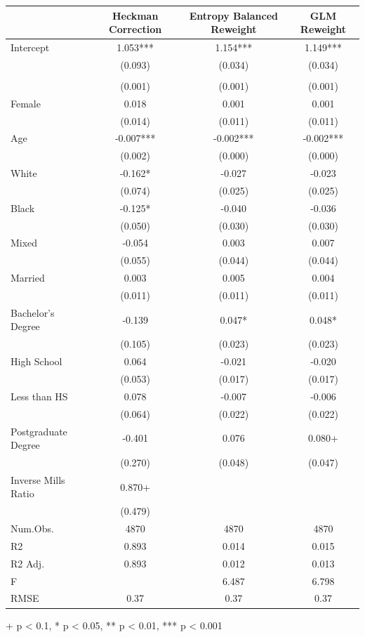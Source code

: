 \documentclass[
]{article}
\begin{document}
\begin{table}[t]
\fontsize{12.0pt}{14.4pt}\selectfont
\begin{tabular*}{\linewidth}{@{\extracolsep{\fill}}lccc}
\toprule
  & Heckman Correction & Entropy Balanced Reweight & GLM Reweight \\ 
\midrule\addlinespace[2.5pt]
Intercept & 1.053*** & 1.154*** & 1.149*** \\ 
 & (0.093) & (0.034) & (0.034) \\ 
{\cellcolor[HTML]{ADD8E6}{Unemployment Duration (Months)}} & {\cellcolor[HTML]{ADD8E6}{-0.006***}} & {\cellcolor[HTML]{ADD8E6}{-0.006***}} & {\cellcolor[HTML]{ADD8E6}{-0.006***}} \\ 
 & (0.001) & (0.001) & (0.001) \\ 
Female & 0.018 & 0.001 & 0.001 \\ 
 & (0.014) & (0.011) & (0.011) \\ 
Age & -0.007*** & -0.002*** & -0.002*** \\ 
 & (0.002) & (0.000) & (0.000) \\ 
White & -0.162* & -0.027 & -0.023 \\ 
 & (0.074) & (0.025) & (0.025) \\ 
Black & -0.125* & -0.040 & -0.036 \\ 
 & (0.050) & (0.030) & (0.030) \\ 
Mixed & -0.054 & 0.003 & 0.007 \\ 
 & (0.055) & (0.044) & (0.044) \\ 
Married & 0.003 & 0.005 & 0.004 \\ 
 & (0.011) & (0.011) & (0.011) \\ 
Bachelor's Degree & -0.139 & 0.047* & 0.048* \\ 
 & (0.105) & (0.023) & (0.023) \\ 
High School & 0.064 & -0.021 & -0.020 \\ 
 & (0.053) & (0.017) & (0.017) \\ 
Less than HS & 0.078 & -0.007 & -0.006 \\ 
 & (0.064) & (0.022) & (0.022) \\ 
Postgraduate Degree & -0.401 & 0.076 & 0.080+ \\ 
 & (0.270) & (0.048) & (0.047) \\ 
Inverse Mills Ratio & 0.870+ &  &  \\ 
{} & {(0.479)} & {} & {} \\ 
Num.Obs. & 4870 & 4870 & 4870 \\ 
R2 & 0.893 & 0.014 & 0.015 \\ 
R2 Adj. & 0.893 & 0.012 & 0.013 \\ 
F &  & 6.487 & 6.798 \\ 
RMSE & 0.37 & 0.37 & 0.37 \\ 
\bottomrule
\end{tabular*}
\begin{minipage}{\linewidth}
+ p < 0.1, * p < 0.05, ** p < 0.01, *** p < 0.001\\
\end{minipage}
\end{table}
\end{document}
